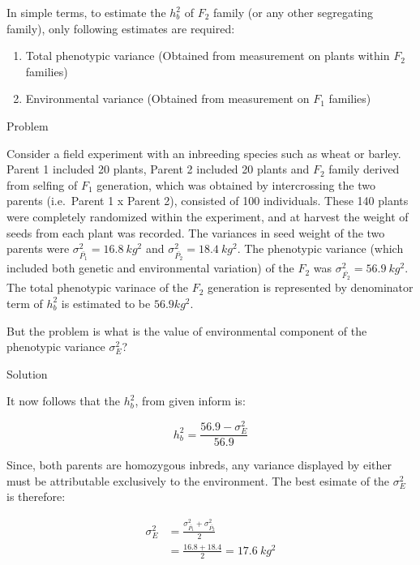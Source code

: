 \documentclass[11pt,dvipsnames,ignorenonframetext,aspectratio=169]{beamer}
\providecommand{\tightlist}{%
  \setlength{\itemsep}{0pt}\setlength{\parskip}{0pt}}
\begin{document}
\begin{frame}{}
\protect\hypertarget{section-10}{}

In simple terms, to estimate the \(h_b^2\) of \(F_2\) family (or any
other segregating family), only following estimates are required:

\begin{enumerate}
\tightlist
\item
  Total phenotypic variance (Obtained from measurement on plants within
  \(F_2\) families)
\item
  Environmental variance (Obtained from measurement on \(F_1\) families)
\end{enumerate}

\end{frame}

\begin{frame}{Problem}
\protect\hypertarget{problem}{}

Consider a field experiment with an inbreeding species such as wheat or
barley. Parent 1 included 20 plants, Parent 2 included 20 plants and
\(F_2\) family derived from selfing of \(F_1\) generation, which was
obtained by intercrossing the two parents (i.e.~Parent 1 x Parent 2),
consisted of 100 individuals. These 140 plants were completely
randomized within the experiment, and at harvest the weight of seeds
from each plant was recorded. The variances in seed weight of the two
parents were \(\sigma_{\bar{P_1}}^2 = 16.8~kg^2\) and
\(\sigma_{\bar{P_2}}^2 = 18.4~kg^2\). The phenotypic variance (which
included both genetic and environmental variation) of the \(F_2\) was
\(\sigma_{\bar{F_2}}^2 = 56.9~kg^2\). The total phenotypic varinace of
the \(F_2\) generation is represented by denominator term of \(h_b^2\)
is estimated to be \(56.9 kg^2\).

But the problem is what is the value of environmental component of the
phenotypic variance \(\sigma_E^2\)?

\end{frame}

\begin{frame}{Solution}
\protect\hypertarget{solution}{}

It now follows that the \(h_b^2\), from given inform is:

\[
h_b^2 = \frac{56.9-\sigma_E^2}{56.9}
\]

Since, both parents are homozygous inbreds, any variance displayed by
either must be attributable exclusively to the environment. The best
esimate of the \(\sigma_E^2\) is therefore:

\[
\begin{aligned}
\sigma_E^2 &= \frac{\sigma_{\bar{P_1}}^2 + \sigma_{\bar{P_2}}^2}{2} \\
&= \frac{16.8 + 18.4}{2} = 17.6~kg^2
\end{aligned}
\]

\end{frame}
\end{document}
